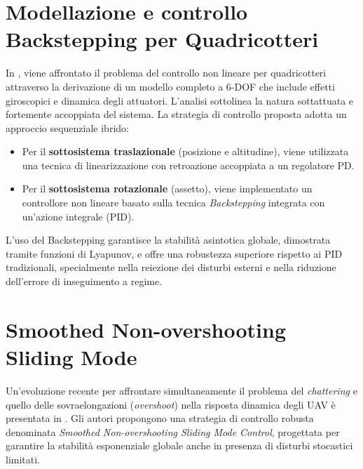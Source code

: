 \clearpage
\section{Modellazione e controllo Backstepping per Quadricotteri}
In \cite{mian2008}, viene affrontato il problema del controllo non lineare per quadricotteri attraverso la derivazione di un modello completo a 6-DOF che include effetti giroscopici e dinamica degli attuatori. L'analisi sottolinea la natura sottattuata e fortemente accoppiata del sistema.
La strategia di controllo proposta adotta un approccio sequenziale ibrido:
\begin{itemize}
    \item Per il \textbf{sottosistema traslazionale} (posizione e altitudine), viene utilizzata una tecnica di linearizzazione con retroazione accoppiata a un regolatore PD.
    \item Per il \textbf{sottosistema rotazionale} (assetto), viene implementato un controllore non lineare basato sulla tecnica \textit{Backstepping} integrata con un'azione integrale (PID).
\end{itemize}
L'uso del Backstepping garantisce la stabilità asintotica globale, dimostrata tramite funzioni di Lyapunov, e offre una robustezza superiore rispetto ai PID tradizionali, specialmente nella reiezione dei disturbi esterni e nella riduzione dell'errore di inseguimento a regime.

\clearpage
\section{Smoothed Non-overshooting Sliding Mode}
Un'evoluzione recente per affrontare simultaneamente il problema del \textit{chattering} e quello delle sovraelongazioni (\textit{overshoot}) nella risposta dinamica degli UAV è presentata in \cite{Wang2024}.
Gli autori propongono una strategia di controllo robusta denominata \textit{Smoothed Non-overshooting Sliding Mode Control}, progettata per garantire la stabilità esponenziale globale anche in presenza di disturbi stocastici limitati.

